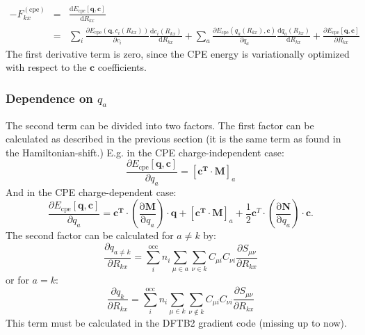 \documentclass{article}
\numberwithin{equation}{section}
\begin{document}
\begin{eqnarray}
-F_{kx}^\mathrm{(cpe)} &=& \frac{\mathrm{d} E_\mathrm{{cpe}}\left[\mathbf{q}, \mathbf{c}\right]}{\mathrm{d} R_{kx}} \nonumber\\
    &=& \sum_i \frac{\partial E_\mathrm{{cpe}}\left(\mathbf{q}, c_{i}(R_{kx})\right)}{\partial c_{i}}    
    \frac{\mathrm{d} c_{i}(R_{kx})}{\mathrm{d} R_{kx}} 
    + \sum_a \frac{\partial E_\mathrm{{cpe}}\left(q_a(R_{kx}), \mathbf{c}\right)}{\partial q_a}    
    \frac{\mathrm{d} q_a(R_{kx})}{\mathrm{d} R_{kx}} 
    + \frac{\partial E_\mathrm{{cpe}}\left[\mathbf{q}, \mathbf{c}\right]}{\partial R_{kx}}
\end{eqnarray}
The first derivative term is zero, since the CPE energy is variationally optimized with respect to the $\mathbf{c}$ coefficients. 
\subsubsection{Dependence on $q_a$}
The second term can be divided into two factors. The first factor can be calculated as described in the previous section (it is the same term as found in the Hamiltonian-shift.) 
E.g. in the CPE charge-independent case:
\begin{equation}
    \frac{\partial E_{\mathrm{cpe}}\left[\mathbf{q}, \mathbf{c}\right]}{\partial q_a} = [\mathbf{c^T}  \cdot \mathbf{M}]_a
\end{equation}
And in the CPE charge-dependent case:
\begin{equation}
    \frac{\partial E_{\mathrm{cpe}}\left[\mathbf{q}, \mathbf{c}\right]}{\partial q_a} = 
    \mathbf{c^T} \cdot \left( \frac{\mathrm{\partial}\mathbf{M}}{\mathrm{\partial}q_a}\right) \cdot \mathbf{q} 
    + [\mathbf{c^T}  \cdot \mathbf{M}]_a + \frac{1}{2}\mathbf{c}^T \cdot \left( \frac{\mathrm{\partial}\mathbf{N}}{\mathrm{\partial}q_a}\right) \cdot \mathbf{c}. 
\end{equation}
The second factor can be calculated for $a \neq k$ by:\cite{dftb3}
\begin{equation}
    \frac{\partial q_{a\neq k}}{\partial R_{kx}} 
    = \sum_i^\mathrm{occ} n_i \sum_{\mu \in a} \sum_{\nu \in k}  C_{\mu i} C_{\nu i}\frac{\partial S_{\mu\nu}}{\partial R_{kx}}
\end{equation}
or for $a=k$:
\begin{equation}
    \frac{\partial q_{k}}{\partial R_{kx}} 
    = \sum_i^\mathrm{occ} n_i \sum_{\mu \in k} \sum_{\nu \not\in k}  C_{\mu i} C_{\nu i}\frac{\partial S_{\mu\nu}}{\partial R_{kx}}
\end{equation}
This term must be calculated in the DFTB2 gradient code (missing up to now). 
\end{document}
